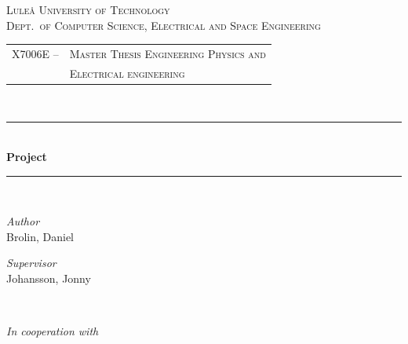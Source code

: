 \newcommand{\HRule}{\rule{\linewidth}{0.5mm}}
\center %


\textsc{\LARGE Luleå University of Technology}\\[1.5cm] %

\textsc{\Large Dept.\ of Computer Science, Electrical and Space Engineering}\\[0.5cm] %

\begin{centering}
\begin{tabular}{l l}
\textsc{\large X7006E --}	& \textsc{\large  Master Thesis Engineering Physics and}\\
				& \textsc{\large Electrical engineering} %
\end{tabular}
\end{centering}\\[0.5cm]

\HRule\\[0.8cm]
{\huge\bfseries Project \project}\\[0.4cm] %
\HRule\\[1.5cm]

\begin{minipage}{0.4\textwidth}
	\begin{flushleft}
		\large
		\emph{Author}\\
		Brolin, Daniel \\ 
	\end{flushleft}
	\begin{flushleft}
		\large
		\textit{Supervisor}\\
		Johansson, Jonny
	\end{flushleft}
\end{minipage}
~
\begin{minipage}{0.4\textwidth}
	\begin{flushright}
		\large
		\textit{In cooperation with}\\
		\Large{\company}
	\end{flushright}
\end{minipage}

